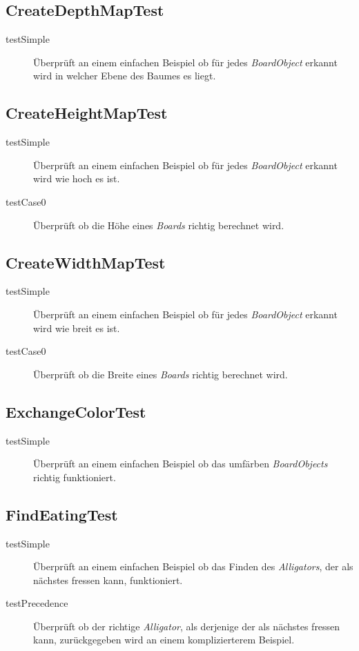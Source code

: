 \subsection{CreateDepthMapTest}
	\begin{description}
		\item[testSimple] Überprüft an einem einfachen Beispiel ob für jedes \emph{BoardObject} erkannt wird in welcher Ebene 
			des Baumes es liegt.
	\end{description}

\subsection{CreateHeightMapTest}
	\begin{description}
		\item[testSimple] Überprüft an einem einfachen Beispiel ob für jedes \emph{BoardObject} erkannt wird wie hoch es ist.
		\item[testCase0] Überprüft ob die Höhe eines \emph{Boards} richtig berechnet wird.
	\end{description}

\subsection{CreateWidthMapTest}
	\begin{description}
		\item[testSimple] Überprüft an einem einfachen Beispiel ob für jedes \emph{BoardObject} erkannt wird wie breit es ist.
		\item[testCase0] Überprüft ob die Breite eines \emph{Boards} richtig berechnet wird.
	\end{description}

\subsection{ExchangeColorTest}
	\begin{description}
		\item[testSimple] Überprüft an einem einfachen Beispiel ob das umfärben \emph{BoardObjects}  richtig funktioniert.
	\end{description}

\subsection{FindEatingTest}
	\begin{description}
		\item[testSimple] Überprüft an einem einfachen Beispiel ob das Finden des \emph{Alligators}, der als nächstes fressen 				kann, funktioniert.
		\item[testPrecedence]Überprüft ob der richtige \emph{Alligator}, als derjenige der als nächstes fressen kann, 
			zurückgegeben wird an einem komplizierterem Beispiel.
	\end{description}
